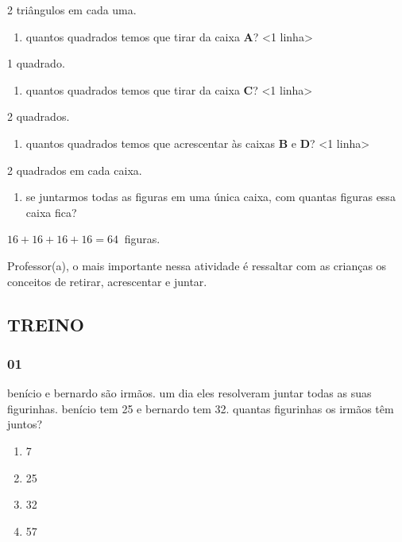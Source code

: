 2 triângulos em cada uma.

\begin{enumerate}
\def\labelenumi{\Alph{enumi})}
\item
  quantos quadrados temos que tirar da caixa \textbf{A}? \textless{}1
  linha\textgreater{}
\end{enumerate}

1 quadrado.

\begin{enumerate}
\def\labelenumi{\Alph{enumi})}
\item
  quantos quadrados temos que tirar da caixa \textbf{C}? \textless{}1
  linha\textgreater{}
\end{enumerate}

2 quadrados.

\begin{enumerate}
\def\labelenumi{\Alph{enumi})}
\item
  quantos quadrados temos que acrescentar às caixas \textbf{B} e
  \textbf{D}? \textless{}1 linha\textgreater{}
\end{enumerate}

2 quadrados em cada caixa.

\begin{enumerate}
\def\labelenumi{\Alph{enumi})}
\item
  se juntarmos todas as figuras em uma única caixa, com quantas figuras
  essa caixa fica?
\end{enumerate}

\(16 + 16 + 16 + 16 = 64\ \) figuras.

Professor(a), o mais importante nessa atividade é ressaltar com as
crianças os conceitos de retirar, acrescentar e juntar.

\subsection{TREINO}\label{treino-1}

\subsubsection{01}\label{section-23}

benício e bernardo são irmãos. um dia eles resolveram juntar todas as
suas figurinhas. benício tem 25 e bernardo tem 32. quantas figurinhas os
irmãos têm juntos?

\begin{enumerate}
\def\labelenumi{\Alph{enumi})}
\item
  7
\item
  25
\item
  32
\item
  57
\end{enumerate}

